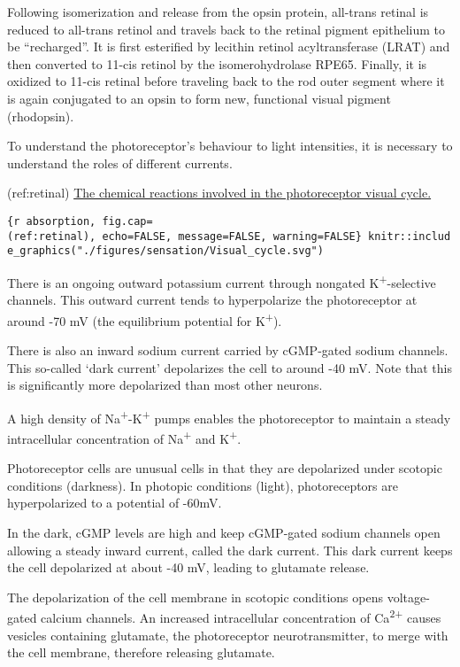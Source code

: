 Following isomerization and release from the opsin protein, all-trans
retinal is reduced to all-trans retinol and travels back to the retinal
pigment epithelium to be ``recharged''. It is first esterified by
lecithin retinol acyltransferase (LRAT) and then converted to 11-cis
retinol by the isomerohydrolase RPE65. Finally, it is oxidized to 11-cis
retinal before traveling back to the rod outer segment where it is again
conjugated to an opsin to form new, functional visual pigment
(rhodopsin).

To understand the photoreceptor's behaviour to light intensities, it is
necessary to understand the roles of different currents.

(ref:retinal)
\href{https://commons.wikimedia.org/wiki/File:Visual_cycle.svg}{The
chemical reactions involved in the photoreceptor visual cycle.}

\texttt{\{r\ absorption,\ fig.cap=\textquotesingle{}(ref:retinal)\textquotesingle{},\ echo=FALSE,\ message=FALSE,\ warning=FALSE\}\ knitr::include\_graphics("./figures/sensation/Visual\_cycle.svg")}

There is an ongoing outward potassium current through nongated
K\textsuperscript{+}-selective channels. This outward current tends to
hyperpolarize the photoreceptor at around -70 mV (the equilibrium
potential for K\textsuperscript{+}).

There is also an inward sodium current carried by cGMP-gated sodium
channels. This so-called `dark current' depolarizes the cell to around
-40 mV. Note that this is significantly more depolarized than most other
neurons.

A high density of Na\textsuperscript{+}-K\textsuperscript{+} pumps
enables the photoreceptor to maintain a steady intracellular
concentration of Na\textsuperscript{+} and K\textsuperscript{+}.

Photoreceptor cells are unusual cells in that they are depolarized under
scotopic conditions (darkness). In photopic conditions (light),
photoreceptors are hyperpolarized to a potential of -60mV.

In the dark, cGMP levels are high and keep cGMP-gated sodium channels
open allowing a steady inward current, called the dark current. This
dark current keeps the cell depolarized at about -40 mV, leading to
glutamate release.

The depolarization of the cell membrane in scotopic conditions opens
voltage-gated calcium channels. An increased intracellular concentration
of Ca\textsuperscript{2+} causes vesicles containing glutamate, the
photoreceptor neurotransmitter, to merge with the cell membrane,
therefore releasing glutamate.

